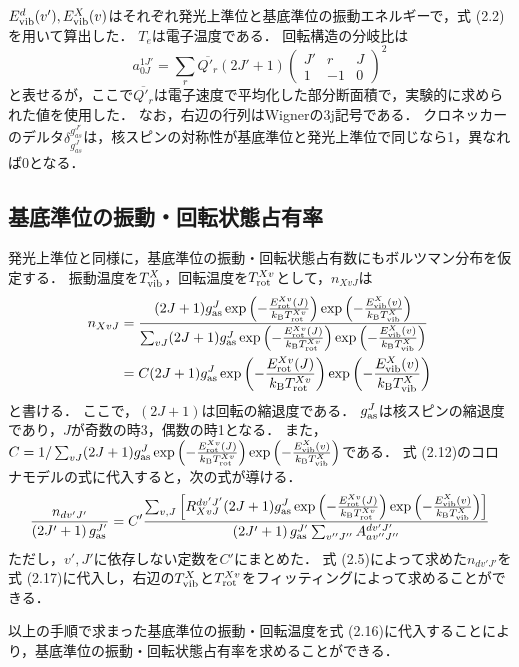 $E^d_{\rm vib} (v'), E^X_{\rm vib} (v)$はそれぞれ発光上準位と基底準位の振動エネルギーで，式 (2.2)を用いて算出した．
$T_{e}$は電子温度である．
回転構造の分岐比は
\begin{equation}
    a^{1J'}_{0J} = \sum_r \overline{Q'_{r}} (2J'+1) \left( \begin{array}{ccc} J' & r & J \\ 1 & -1 & 0 \end{array} \right)^2
\end{equation}
と表せる\cite{kyokaisou}が，ここで$\overline{Q'_{r}}$は電子速度で平均化した部分断面積で，実験的に求められた値\cite{senkusya}を使用した．
なお，右辺の行列はWignerの3j記号である．
クロネッカーのデルタ$\delta^{g^{J'}_{as}}_{g^J_{as}}$は，核スピンの対称性が基底準位と発光上準位で同じなら1，異なれば0となる．

\subsection{基底準位の振動・回転状態占有率}
発光上準位と同様に，基底準位の振動・回転状態占有数にもボルツマン分布を仮定する．
振動温度を$T^X_{\rm vib}$，回転温度を$T^{Xv}_{\rm rot}$として，$n_{XvJ}$は
\begin{equation}
\begin{split}
    n_{XvJ} &= \frac{ (2J+1) g^J_{\rm as} \exp \left( - \frac{E^{Xv}_{\rm rot}(J)}{k_{\rm B} T^{Xv}_{\rm rot}} \right) \exp \left( - \frac{E^{X}_{\rm vib}(v)}{k_{\rm B} T^{X}_{\rm vib}} \right) }{\sum_{vJ} (2J+1) g^J_{\rm as} \exp \left( - \frac{E^{Xv}_{\rm rot}(J)}{k_{\rm B} T^{Xv}_{\rm rot}} \right) \exp \left( - \frac{E^{X}_{\rm vib}(v)}{k_{\rm B} T^{X}_{\rm vib}} \right)}\\
    &= C (2J+1) g^J_{\rm as} \exp \left( - \frac{E^{Xv}_{\rm rot}(J)}{k_{\rm B} T^{Xv}_{\rm rot}} \right) \exp \left( - \frac{E^{X}_{\rm vib}(v)}{k_{\rm B} T^{X}_{\rm vib}} \right)
\end{split}
\end{equation}
と書ける．
ここで，$(2J+1)$は回転の縮退度である．
$g^J_{\rm as}$は核スピンの縮退度であり，$J$が奇数の時3，偶数の時1となる．
また，$C = 1 / \sum_{vJ} (2J+1) g^J_{\rm as} \exp \left( - \frac{E^{Xv}_{\rm rot}(J)}{k_{\rm B} T^{Xv}_{\rm rot}} \right) \exp \left( - \frac{E^{X}_{\rm vib}(v)}{k_{\rm B} T^{X}_{\rm vib}} \right)$である．
式 (2.12)のコロナモデルの式に代入すると，次の式が導ける．
\begin{equation}
    \frac{n_{dv'J'}}{\left( 2J'+1 \right) g^{J'}_{\rm as}} = C' \frac{ \sum_{v, J} \left[ R^{dv'J'}_{XvJ} (2J+1) g^J_{\rm as} \exp \left( - \frac{E^{Xv}_{\rm rot}(J)}{k_{\rm B} T^{Xv}_{\rm rot}} \right) \exp \left( - \frac{E^{X}_{\rm vib}(v)}{k_{\rm B} T^{X}_{\rm vib}} \right) \right] } {\left( 2J'+1 \right) g^{J'}_{\rm as} \sum_{v''J''} A^{dv'J'}_{av''J''} }
\end{equation}
ただし，$v', J'$に依存しない定数を$C'$にまとめた．
式 (2.5)によって求めた$n_{dv'J'}$を式 (2.17)に代入し，右辺の$T^{X}_{\rm vib}$と$T^{Xv}_{\rm rot}$をフィッティングによって求めることができる．

以上の手順で求まった基底準位の振動・回転温度を式 (2.16)に代入することにより，基底準位の振動・回転状態占有率を求めることができる．